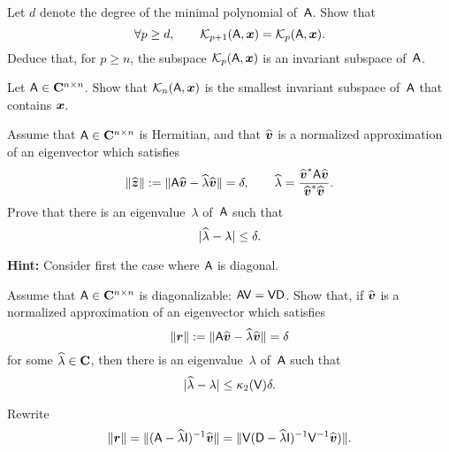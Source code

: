 \begin{exercise}
    Let $d$ denote the degree of the minimal polynomial of~$\mathsf A$.
    Show that
    \[
        \forall p \geq d, \qquad
        \mathcal K_{p+1}(\mathsf A, \mathbf{\boldsymbol{x}}) =
        \mathcal K_{p}(\mathsf A, \mathbf{\boldsymbol{x}}).
    \]
    Deduce that, for $p \geq n$,
    the subspace $\mathcal K_{p}(\mathsf A, \mathbf{\boldsymbol{x}})$ is an invariant subspace of~$\mathsf A$.
\end{exercise}

\begin{exercise}
    Let $\mathsf A \in \mathbf C^{n \times n}$.
    Show that $\mathcal K_{n}(\mathsf A, \mathbf{\boldsymbol{x}})$ is the smallest invariant subspace of~$\mathsf A$ that contains $\mathbf{\boldsymbol{x}}$.
\end{exercise}

\begin{exercise}
    \label{exercise:a_posteriori_1}
    Assume that $\mathsf A \in \mathbf C^{n \times n}$ is Hermitian,
    and that $\widehat {\mathbf{\boldsymbol{v}}}$ is a normalized approximation of an eigenvector which satisfies
    \[
        \lVert\widehat {\mathbf{\boldsymbol{z}}}\rVert :=  \lVert\mathsf A \widehat {\mathbf{\boldsymbol{v}}} - \widehat \lambda \widehat {\mathbf{\boldsymbol{v}}}\rVert = \delta,
        \qquad \widehat \lambda = \frac{\widehat {\mathbf{\boldsymbol{v}}}^* \mathsf A \widehat {\mathbf{\boldsymbol{v}}}}{\widehat {\mathbf{\boldsymbol{v}}}^* \widehat {\mathbf{\boldsymbol{v}}}}.
    \]
    Prove that there is an eigenvalue~$\lambda$ of~$\mathsf A$ such that
    \[
        \lvert\widehat \lambda - \lambda\rvert \leq \delta.
    \]

    \noindent \textbf{Hint:} Consider first the case where $\mathsf A$ is diagonal.
\end{exercise}

\begin{exercise}
    \label{exercise:a_posteriori_2}
    Assume that $\mathsf A \in \mathbf C^{n \times n}$ is diagonalizable: $\mathsf A \mathsf V = \mathsf V \mathsf D$.
    Show that, if $\widehat {\mathbf{\boldsymbol{v}}}$ is a normalized approximation of an eigenvector which satisfies
    \[
        \lVert\mathbf{\boldsymbol{r}}\rVert :=  \lVert\mathsf A \widehat {\mathbf{\boldsymbol{v}}} - \widehat \lambda \widehat {\mathbf{\boldsymbol{v}}}\rVert = \delta
    \]
    for some $\widehat \lambda \in \mathbf C$,
    then there is an eigenvalue~$\lambda$ of~$\mathsf A$ such that
    \[
        \lvert\widehat \lambda - \lambda\rvert \leq \kappa_2(\mathsf V) \delta.
    \]

    Rewrite
    \[
        \lVert\mathbf{\boldsymbol{r}}\rVert = \lVert(\mathsf A - \widehat \lambda \mathsf I)^{-1} \widehat {\mathbf{\boldsymbol{v}}}\rVert
        = \lVert\mathsf V (\mathsf D - \widehat \lambda \mathsf I)^{-1}  \mathsf V^{-1}\widehat {\mathbf{\boldsymbol{v}}})\rVert.
    \]
\end{exercise}

